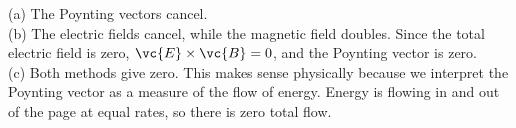 (a) The Poynting vectors cancel.\\
(b) The electric fields cancel, while the magnetic field
doubles. Since the total electric field is zero, $\vc{E}\times\vc{B}=0$,
and the Poynting vector is zero.\\
(c) Both methods give zero. This makes sense physically because
we interpret the Poynting vector as a measure of the flow of energy.
Energy is flowing in and out of the page at equal rates, so there is
zero total flow.

